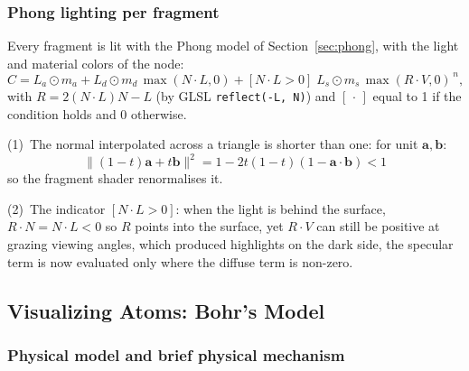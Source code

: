 \documentclass[a4paper, 11pt]{article}
\newcommand{\code}[1]{\texttt{#1}}
\begin{document}
\subsubsection{Phong lighting per fragment}\label{sec:phong2}

Every fragment is lit with the Phong model of Section~\ref{sec:phong}, with the light and material colors of the node:
\begin{equation}
  C=L_a\odot m_a+L_d\odot m_d\,\max(N\!\cdot\!L,0)+[N\!\cdot\!L>0]\;L_s\odot m_s\,\max(R\!\cdot\!V,0)^{\,n},
  \label{eq:phong2}
\end{equation}
with $R=2(N\cdot L)N-L$ (by GLSL \code{reflect(-L, N)}) and $[\,\cdot\,]$ equal to 1 if the condition holds and 0 otherwise.

(1)~The normal interpolated across a triangle is shorter than one: for unit $\mathbf a,\mathbf b$:
\[\|(1-t)\mathbf a+t\mathbf b\|^2=1-2t(1-t)(1-\mathbf a\cdot\mathbf b)<1\]
so the fragment shader renormalises it.

(2)~The indicator $[N\cdot L>0]$: when the light is behind the surface, $R\cdot N=N\cdot L<0$ so $R$ points into the surface, yet
$R\cdot V$ can still be positive at grazing viewing angles, which produced highlights on the dark side, the specular term is now
evaluated only where the diffuse term is non-zero.

\subsection{Visualizing Atoms: Bohr's Model}\label{sec:bohr}

\subsubsection{Physical model and brief physical mechanism}\label{sec:bohrphys}
\end{document}
